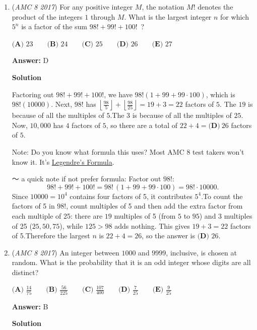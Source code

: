 \begin{enumerate}
 


	\item (\textit{AMC 8 2017}) For any positive integer $M$, the notation $M!$ denotes the product of the integers $1$ through $M$. What is the largest integer $n$ for which $5^n$ is a factor of the sum $98!+99!+100!$ ?


 $\textbf{(A) }23\qquad\textbf{(B) }24\qquad\textbf{(C) }25\qquad\textbf{(D) }26\qquad\textbf{(E) }27$

 \textbf{Answer: }D



\textbf{Solution}

Factoring out $98!+99!+100!$, we have $98! (1+99+99\cdot100)$, which is $98! (10000)$. Next, $98!$ has $\left\lfloor\frac{98}{5}\right\rfloor + \left\lfloor\frac{98}{25}\right\rfloor = 19 + 3 = 22$ factors of $5$. The $19$ is because of all the multiples of $5$.The $3$ is because of all the multiples of $25$. Now, $10,000$ has $4$ factors of $5$, so there are a total of $22 + 4 = \boxed{\textbf{(D)}\ 26}$ factors of $5$.

 Note: Do you know what formula this uses? Most AMC 8 test takers won't know it. It's \href{https://artofproblemsolving.com/wiki/index.php?title=Legendre\%27s\_Formula}{Legendre's Formula}.

 ～ a quick note if not prefer formula: Factor out $98!$:
 \[98! + 99! + 100! = 98!\,(1 + 99 + 99\cdot 100) = 98! \cdot 10000.\]Since $10000 = 10^4$ contains four factors of 5, it contributes $5^4$.To count the factors of 5 in $98!$, count multiples of 5 and then add the extra factor from each multiple of 25: there are $19$ multiples of 5 (from $5$ to $95$) and $3$ multiples of 25 ($25, 50, 75$), while $125 > 98$ adds nothing. This gives $19 + 3 = 22$ factors of 5.Therefore the largest $n$ is $22 + 4 = 26$, so the answer is $\boxed{\textbf{(D) } 26}$.

 


	\item (\textit{AMC 8 2017}) An integer between $1000$ and $9999$, inclusive, is chosen at random. What is the probability that it is an odd integer whose digits are all distinct?


 $\textbf{(A) }\frac{14}{75}\qquad\textbf{(B) }\frac{56}{225}\qquad\textbf{(C) }\frac{107}{400}\qquad\textbf{(D) }\frac{7}{25}\qquad\textbf{(E) }\frac{9}{25}$

 \textbf{Answer: }B



\textbf{Solution}


\end{enumerate}

